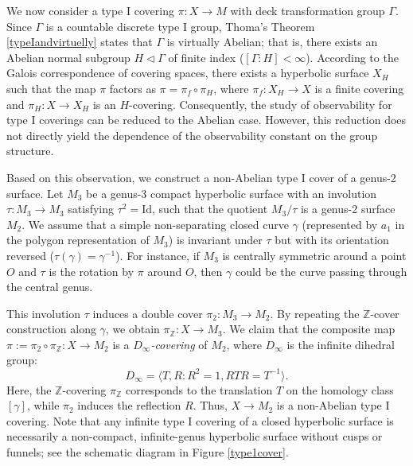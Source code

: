 \documentclass[11pt,oneside,reqno]{amsart}
\theoremstyle{definition}
\numberwithin{equation}{section}
\theoremstyle{plain}
\begin{document}
We now consider a type I covering $\pi: X \to M$ with deck transformation group $\Gamma$. Since $\Gamma$ is a countable discrete type I group, Thoma's Theorem \ref{typeIandvirtuelly} states that $\Gamma$ is virtually Abelian; that is, there exists an Abelian normal subgroup $H \triangleleft
 \Gamma$ of finite index ($[\Gamma: H] < \infty$). According to the Galois correspondence of covering spaces, there exists a hyperbolic surface $X_H$ such that the map $\pi$ factors as $\pi = \pi_{f} \circ \pi_{H}$, where $\pi_{f}: X_H \to X$ is a finite covering and $\pi_{H}: X \to X_H$ is an $H$-covering. Consequently, the study of observability for type I coverings can be reduced to the Abelian case. However, this reduction does not directly yield the dependence of the observability constant on the group structure.

Based on this observation, we construct a non-Abelian type I cover of a genus-2 surface. Let $M_3$ be a genus-3 compact hyperbolic surface with an involution $\tau: M_3 \to M_3$ satisfying $\tau^2 = \mathrm{Id}$, such that the quotient $M_3 / \tau$ is a genus-2 surface $M_2$. We assume that a simple non-separating closed curve $\gamma$ (represented by $a_1$ in the polygon representation of $M_3$) is invariant under $\tau$ but with its orientation reversed ($\tau(\gamma) = \gamma^{-1}$). For instance, if $M_3$ is centrally symmetric around a point $O$ and $\tau$ is the rotation by $\pi$ around $O$, then $\gamma$ could be the curve passing through the central genus.

This involution $\tau$ induces a double cover $\pi_2: M_3 \to M_2$. By repeating the $\mathbb{Z}$-cover construction along $\gamma$, we obtain $\pi_{\mathbb{Z}}: X \to M_3$. We claim that the composite map $\pi := \pi_2 \circ \pi_{\mathbb{Z}}: X \to M_2$ is a \emph{$D_\infty$-covering} of $M_2$, where $D_\infty$ is the infinite dihedral group:
\begin{equation}
    D_\infty = \langle T, R : R^2=1, RTR=T^{-1} \rangle.
\end{equation}
Here, the $\mathbb{Z}$-covering $\pi_{\mathbb{Z}}$ corresponds to the translation $T$ on the homology class $[\gamma]$, while $\pi_2$ induces the reflection $R$. Thus, $X \to M_2$ is a non-Abelian type I covering. Note that any infinite type I covering of a closed hyperbolic surface is necessarily a non-compact, infinite-genus hyperbolic surface without cusps or funnels; see the schematic diagram in Figure \ref{type1cover}.
\end{document}
